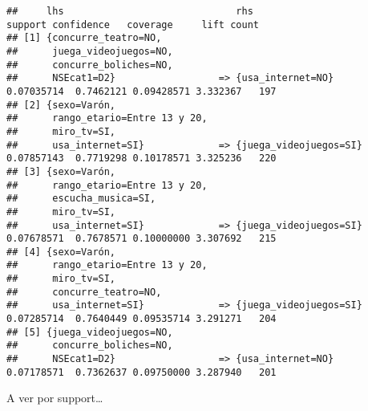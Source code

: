 \documentclass[
]{article}
\begin{document}
\begin{verbatim}
##     lhs                              rhs                       support confidence   coverage     lift count
## [1] {concurre_teatro=NO,                                                                                   
##      juega_videojuegos=NO,                                                                                 
##      concurre_boliches=NO,                                                                                 
##      NSEcat1=D2}                  => {usa_internet=NO}      0.07035714  0.7462121 0.09428571 3.332367   197
## [2] {sexo=Varón,                                                                                           
##      rango_etario=Entre 13 y 20,                                                                           
##      miro_tv=SI,                                                                                           
##      usa_internet=SI}             => {juega_videojuegos=SI} 0.07857143  0.7719298 0.10178571 3.325236   220
## [3] {sexo=Varón,                                                                                           
##      rango_etario=Entre 13 y 20,                                                                           
##      escucha_musica=SI,                                                                                    
##      miro_tv=SI,                                                                                           
##      usa_internet=SI}             => {juega_videojuegos=SI} 0.07678571  0.7678571 0.10000000 3.307692   215
## [4] {sexo=Varón,                                                                                           
##      rango_etario=Entre 13 y 20,                                                                           
##      miro_tv=SI,                                                                                           
##      concurre_teatro=NO,                                                                                   
##      usa_internet=SI}             => {juega_videojuegos=SI} 0.07285714  0.7640449 0.09535714 3.291271   204
## [5] {juega_videojuegos=NO,                                                                                 
##      concurre_boliches=NO,                                                                                 
##      NSEcat1=D2}                  => {usa_internet=NO}      0.07178571  0.7362637 0.09750000 3.287940   201
\end{verbatim}

A ver por support\ldots{}
\end{document}
